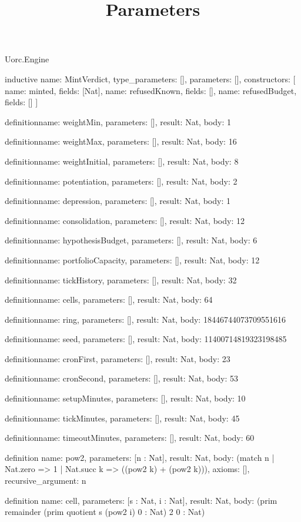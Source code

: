 \begin{lexlean}{Uorc.Engine}
\title{Parameters}
\begin{semanticmodule}
inductive{
  name: MintVerdict,
  type_parameters: [],
  parameters: [],
  constructors: [
    {name: minted, fields: [Nat]},
    {name: refusedKnown, fields: []},
    {name: refusedBudget, fields: []}
  ]
}

definition{name: weightMin, parameters: [], result: Nat, body: 1}

definition{name: weightMax, parameters: [], result: Nat, body: 16}

definition{name: weightInitial, parameters: [], result: Nat, body: 8}

definition{name: potentiation, parameters: [], result: Nat, body: 2}

definition{name: depression, parameters: [], result: Nat, body: 1}

definition{name: consolidation, parameters: [], result: Nat, body: 12}

definition{name: hypothesisBudget, parameters: [], result: Nat, body: 6}

definition{name: portfolioCapacity, parameters: [], result: Nat, body: 12}

definition{name: tickHistory, parameters: [], result: Nat, body: 32}

definition{name: cells, parameters: [], result: Nat, body: 64}

definition{name: ring, parameters: [], result: Nat, body: 18446744073709551616}

definition{name: seed, parameters: [], result: Nat, body: 11400714819323198485}

definition{name: cronFirst, parameters: [], result: Nat, body: 23}

definition{name: cronSecond, parameters: [], result: Nat, body: 53}

definition{name: setupMinutes, parameters: [], result: Nat, body: 10}

definition{name: tickMinutes, parameters: [], result: Nat, body: 45}

definition{name: timeoutMinutes, parameters: [], result: Nat, body: 60}

definition{
  name: pow2,
  parameters: [n : Nat],
  result: Nat,
  body: (match n | Nat.zero => 1 | Nat.succ k => ((pow2 k) + (pow2 k))),
  axioms: [],
  recursive_argument: n
}

definition{
  name: cell,
  parameters: [s : Nat, i : Nat],
  result: Nat,
  body: (prim remainder (prim quotient s (pow2 i) 0 : Nat) 2 0 : Nat)
}


\end{semanticmodule}
\end{lexlean}
